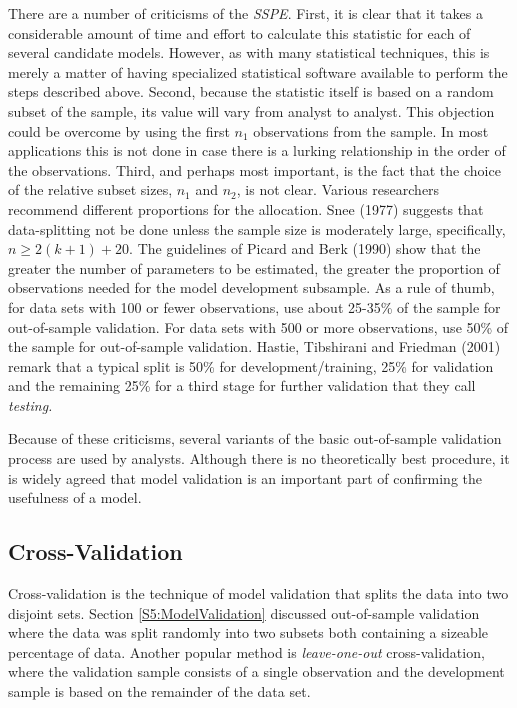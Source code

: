 There are a number of criticisms of the \textit{SSPE}. First, it is
clear that it takes a considerable amount of time and effort to
calculate this statistic for each of several candidate models.
However, as with many statistical techniques, this is merely a
matter of having specialized statistical software available to
perform the steps described above. Second, because the statistic
itself is based on a random subset of the sample, its value will
vary from analyst to analyst. This objection could be overcome by
using the first $n_1$ observations from the sample. In most
applications this is not done in case there is a lurking
relationship in the order of the observations. Third, and perhaps
most important, is the fact that the choice of the relative subset
sizes, $n_1$ and $n_2$, is not clear. Various researchers recommend
different proportions for the allocation. Snee (1977) suggests that
data-splitting not be done unless the sample size is moderately
large, specifically, $n\geq 2(k+1)+20$. The guidelines of Picard and
Berk (1990) show that the greater the number of parameters to be
estimated, the greater the proportion of observations needed for the
model development subsample. As a rule of thumb, for data sets with
100 or fewer observations, use about 25-35\% of the sample for
out-of-sample validation. For data sets with 500 or more
observations, use 50\% of the sample for out-of-sample validation.
Hastie, Tibshirani and Friedman (2001) remark that a typical split
is 50\% for development/training, 25\% for validation and the
remaining 25\% for a third stage for further validation that they
call \textit{testing.}

Because of these criticisms, several variants of the basic out-of-sample
validation process are used by analysts. Although there is no theoretically
best procedure, it is widely agreed that model validation is an important
part of confirming the usefulness of a model.

\subsection{Cross-Validation}\label{S5:CrossV}

Cross-validation is the technique of model validation that splits
the data into two disjoint sets. Section \ref{S5:ModelValidation}
discussed out-of-sample validation where the data was split randomly
into two subsets both containing a sizeable percentage of data.
Another popular method is \emph{leave-one-out} cross-validation,
where the validation sample consists of a single observation and the
development sample is based on the remainder of the data set.

